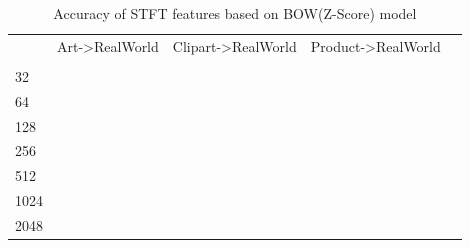 \documentclass[conference]{IEEEtran}
\begin{document}
\begin{table}[htbp]
\caption{Accuracy of STFT features based on BOW(Z-Score) model}
\label{base1}%
\begin{tabular}{@{}p{1cm}<{\centering}|l|l|l|l|l|l|l|l|l|l|}
\hline
\multirow{2}{*}{} & \multicolumn{3}{l|}{Art-\textgreater{}RealWorld} & \multicolumn{3}{l|}{Clipart-\textgreater{}RealWorld} & \multicolumn{3}{l|}{Product-\textgreater{}RealWorld} \\ \cline{2-10} 
                  &                &                &                &                  &                 &                 &                  &                 &                 \\ \hline
32                &                &                &                &                  &                 &                 &                  &                 &                 \\ \hline
64                &                &                &                &                  &                 &                 &                  &                 &                 \\ \hline
128               &                &                &                &                  &                 &                 &                  &                 &                 \\ \hline
256               &                &                &                &                  &                 &                 &                  &                 &                 \\ \hline
512               &                &                &                &                  &                 &                 &                  &                 &                 \\ \hline
1024              &                &                &                &                  &                 &                 &                  &                 &                 \\ \hline
2048              &                &                &                &                  &                 &                 &                  &                 &                 \\ \hline
\end{tabular}
\end{table}
\end{document}
